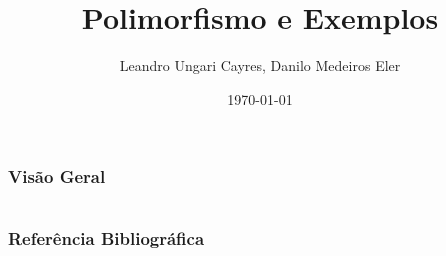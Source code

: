 \documentclass{beamer}
\title[Polimorfismo]
{Polimorfismo e Exemplos}
\author[Leandro U.C., Danilo M.E.]
{Leandro Ungari Cayres\inst{1}, Danilo Medeiros Eler\inst{2}}
\institute[UNESP] 
{
Universidade Estadual Paulista \\ 
\medskip
\textit{leandro.ungari@unesp.br\inst{1}, danilo.eler@unesp.br\inst{2}} 
}
\date{\today}
\begin{document}
\begin{frame}
\titlepage 
\end{frame}

\begin{frame}
\frametitle{Visão Geral} 
\tableofcontents 
\end{frame}





\section*{}
\begin{frame}[allowframebreaks]
  \frametitle{Referência Bibliográfica}
  
  
\end{frame}
\end{document}

